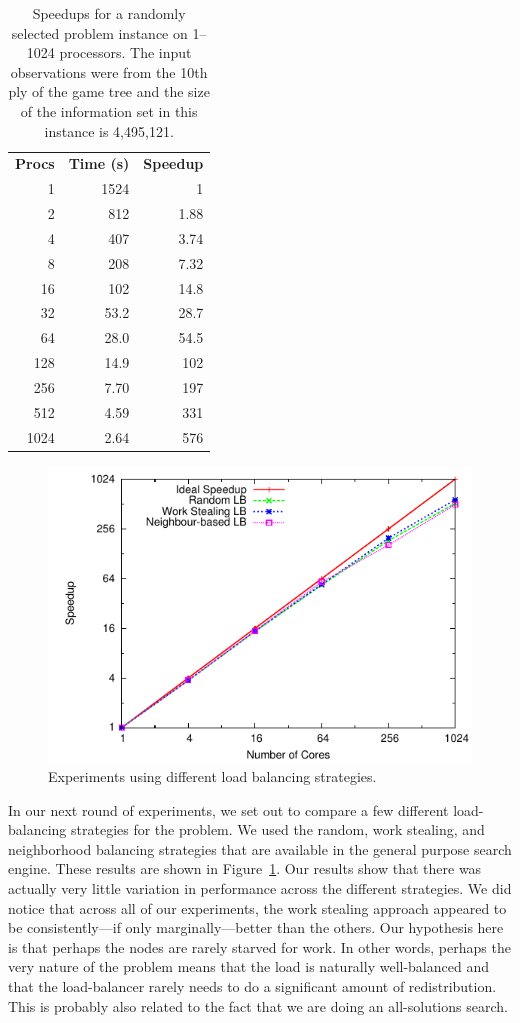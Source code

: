\documentclass[times, 10pt,twocolumn]{article}
\begin{document}
\begin{table}
\centering
\begin{tabular}{rrr}
{\bf Procs}	&	{\bf Time (s)} 	&	{\bf Speedup}\\
1	&	1524	&	1\\
2	&	812	&	1.88\\
4	&	407	&	3.74\\
8	&	208	&	7.32\\
16	&	102	&	14.8\\
32	&	53.2	&	28.7\\
64	&	28.0	&	54.5\\
128	&	14.9	&	102\\
256	&	7.70	&	197\\
512	&	4.59	&	331\\
1024	&	2.64	&	576\\
\end{tabular}
\caption{Speedups for a randomly selected problem instance on 1--1024 processors.  The input observations were from the
10th ply of the game tree and the size of the information set in this instance is 4,495,121.}
\label{speedups}
\end{table}

\begin{figure}[h]
\centering
\includegraphics[width=0.7\columnwidth]{plots/3schemes.pdf}
\caption{Experiments using different load balancing strategies.}
\label{3schemes}
\end{figure}

In our next round of experiments, we set out to compare a few different load-balancing strategies for the problem.  We
used the random, work stealing, and neighborhood balancing strategies that are available in the general purpose search
engine.  These results are shown in Figure~\ref{3schemes}.  Our results show that there was actually very little
variation in performance across the different strategies.  We did notice that across all of our experiments, the work
stealing approach appeared to be consistently---if only marginally---better than the others.  Our hypothesis here is
that perhaps the nodes are rarely starved for work.  In other words, perhaps the very nature of the problem means that
the load is naturally well-balanced and that the load-balancer rarely needs to do a significant amount of
redistribution.  This is probably also related to the fact that we are doing an all-solutions search. 
\end{document}
